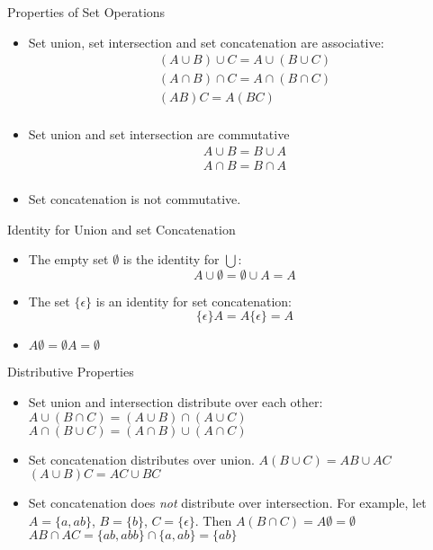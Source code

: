 \documentclass[style=sailor,size=12pt]{powerdot}
\newcommand{\mli}[1]{\mathit{#1}}
\begin{document}
\begin{slide}[bm=,toc=]{Properties of Set Operations}
\begin{itemize}
   \item Set union, set intersection and set concatenation are associative: 
   \[
     \begin{split}
     (A\cup B) \cup C = A \cup (B \cup C) \\
     (A\cap B) \cap C = A \cap (B \cap C) \\
     (\mli{AB})C = A(\mli{BC}) \\
     \end{split}
     \]
   \item Set union and set intersection are commutative
   \[
     \begin{split}
     A\cup B = B \cup A \\
     A\cap B = B \cap A \\
     \end{split}
    \]
    \item Set concatenation is not commutative.
\end{itemize}
\end{slide}

\begin{slide}[bm=,toc=]{Identity for Union and set Concatenation}
\begin{itemize}
   \item The empty set $\emptyset$ is the identity for $\bigcup$:
   \[
     A\cup \emptyset = \emptyset \cup A = A
     \]
   \item The set $\{\epsilon\}$ is an identity for set concatenation:
       \[
         \{\epsilon\}A = A\{\epsilon\} = A
       \]
   \item $A\emptyset = {\emptyset}A = \emptyset$
\end{itemize}
\end{slide}

\begin{slide}[bm=,toc=]{Distributive Properties}
\begin{itemize}
   \item  Set union and intersection distribute over each other:
   $A \cup (B \cap C) = (A\cup B)\cap(A \cup C)$\\
   $A \cap (B \cup C) = (A\cap B)\cup(A \cap C)$

   \item Set concatenation distributes over union. 
    $A(B\cup C) = \mli{AB} \cup \mli{AC}$\\
    $(A\cup B)C = \mli{AC} \cup \mli{BC}$
    \item Set concatenation does \emph{not} distribute over intersection. For
    example, let $A = \{a,ab\}$, $B = \{b\}$, $C = \{\epsilon\}$. Then
       $A(B\cap C) = A\emptyset = \emptyset$ \\
       $\mli{AB} \cap \mli{AC} = \{ab,abb\} \cap \{a,ab\} = \{ab\}$
\end{itemize}
\end{slide}
\end{document}
